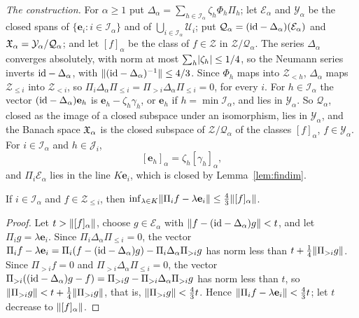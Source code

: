 \emph{The construction.} For $\alpha\ge1$ put $\Delta_\alpha=\sum_{h\in\mathcal I_\alpha}\zeta_h\Phi_h\Pi_h$; let
$\mathcal E_\alpha$ and $\mathcal Y_\alpha$ be the closed spans of $\{\mathbf e_i:i\in\mathcal I_\alpha\}$ and of
$\bigcup_{i\in\mathcal I_\alpha}\mathcal U_i$; put $\mathcal Q_\alpha=(\mathrm{id}-\Delta_\alpha)(\mathcal E_\alpha)$ and
$\mathfrak X_\alpha=\mathcal Y_\alpha/\mathcal Q_\alpha$; and let $[f]_\alpha$ be the class of $f\in\mathcal Z$ in
$\mathcal Z/\mathcal Q_\alpha$. The series $\Delta_\alpha$ converges absolutely, with norm at most
$\sum_h\lvert \zeta_h\rvert\le1/4$, so the Neumann series inverts $\mathrm{id}-\Delta_\alpha$, with
$\lVert (\mathrm{id}-\Delta_\alpha)^{-1}\rVert\le4/3$. Since $\Phi_h$ maps into $\mathcal Z_{<h}$, $\Delta_\alpha$ maps
$\mathcal Z_{\le i}$ into $\mathcal Z_{<i}$, so $\Pi_i\Delta_\alpha\Pi_{\le i}=\Pi_{>i}\Delta_\alpha\Pi_{\le i}=0$, for
every $i$. For $h\in\mathcal I_\alpha$ the vector $(\mathrm{id}-\Delta_\alpha)\mathbf e_h$ is $\mathbf e_h-\zeta_h\gamma_h$, or
$\mathbf e_h$ if $h=\min\mathcal I_\alpha$, and lies in $\mathcal Y_\alpha$. So $\mathcal Q_\alpha$, closed as the image
of a closed subspace under an isomorphism, lies in $\mathcal Y_\alpha$, and the Banach space $\mathfrak X_\alpha$ is the closed
subspace of $\mathcal Z/\mathcal Q_\alpha$ of the classes $[f]_\alpha$, $f\in\mathcal Y_\alpha$. For $i\in\mathcal I_\alpha$ and $h\in\mathcal J_i$,
\begin{equation}\label{rig:eq:quotient}
 [\mathbf e_h]_\alpha=\zeta_h[\gamma_h]_\alpha ,
\end{equation}
and $\Pi_i\mathcal E_\alpha$ lies in the line $K\mathbf e_i$, which is closed by Lemma~\ref{lem:findim}.

\begin{lemma}\label{rig:lem:projection}
If $i\in\mathcal I_\alpha$ and $f\in\mathcal Z_{\le i}$, then
$\inf_{\lambda\in K}\lVert \Pi_if-\lambda\mathbf e_i\rVert\le\frac43\lVert [f]_\alpha\rVert$.
\end{lemma}

\begin{proof}
Let $t>\lVert [f]_\alpha\rVert$, choose $g\in\mathcal E_\alpha$ with $\lVert f-(\mathrm{id}-\Delta_\alpha)g\rVert<t$, and let
$\Pi_ig=\lambda\mathbf e_i$. Since $\Pi_i\Delta_\alpha\Pi_{\le i}=0$, the vector
$\Pi_if-\lambda\mathbf e_i=\Pi_i(f-(\mathrm{id}-\Delta_\alpha)g)-\Pi_i\Delta_\alpha\Pi_{>i}g$ has norm less than
$t+\frac14\lVert \Pi_{>i}g\rVert$. Since $\Pi_{>i}f=0$ and $\Pi_{>i}\Delta_\alpha\Pi_{\le i}=0$, the vector
$\Pi_{>i}((\mathrm{id}-\Delta_\alpha)g-f)=\Pi_{>i}g-\Pi_{>i}\Delta_\alpha\Pi_{>i}g$ has norm less than $t$, so
$\lVert \Pi_{>i}g\rVert<t+\frac14\lVert \Pi_{>i}g\rVert$, that is, $\lVert \Pi_{>i}g\rVert<\frac43t$. Hence
$\lVert \Pi_if-\lambda\mathbf e_i\rVert<\frac43t$; let $t$ decrease to $\lVert [f]_\alpha\rVert$.
\end{proof}

